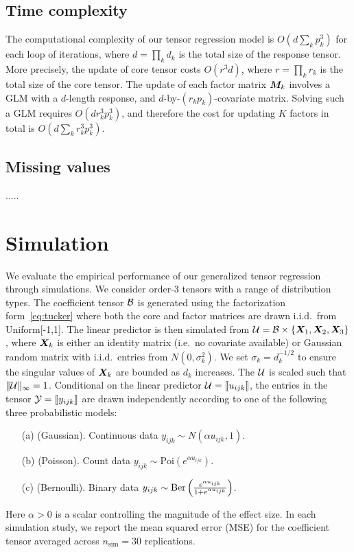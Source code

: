 \documentclass[12pt]{article}
\theoremstyle{plain}
\theoremstyle{definition}
\begin{document}
\subsection{Time complexity}
The computational complexity of our tensor regression model is $O\left(d \sum_k p^3_k\right)$ for each loop of iterations, where $d=\prod_k d_k$ is the total size of the response tensor. More precisely, the update of core tensor costs $O(r^3d)$, where $r=\prod_k r_k$ is the total size of the core tensor. The update of each factor matrix $\bm M_k$ involves a GLM with a $d$-length response, and $d$-by-$(r_kp_k)$-covariate matrix. Solving such a GLM requires $O(dr^3_kp^3_k)$, and therefore the cost for updating $K$ factors in total is $O( d\sum_k r^3_k p_k^3)$.

\subsection{Missing values}
.....

\section{Simulation}\label{sec:simulation}
We evaluate the empirical performance of our generalized tensor regression through simulations. We consider order-3 tensors with a range of distribution types. The coefficient tensor $\mathcal{B}$ is generated using the factorization form~\eqref{eq:tucker} where both the core and factor matrices are drawn i.i.d.\ from Uniform[-1,1]. The linear predictor is then simulated from $\mathcal{U}=\mathcal{B}\times\{\bm X_1,\bm X_2,\bm X_3\}$, where $\bm X_k$ is either an identity matrix (i.e.\ no covariate available) or Gaussian random matrix with i.i.d.\ entries from $N(0,\sigma_k^2)$. We set $\sigma_k=d_k^{-1/2}$ to ensure the singular values of $\bm X_k$ are bounded as $d_k$ increases. The $\mathcal{U}$ is scaled such that $\lVert\mathcal{U}\rVert_\infty=1$. Conditional on the linear predictor $\mathcal{U}=\llbracket u_{ijk} \rrbracket$, the entries in the tensor $\mathcal{Y}=\llbracket y_{ijk} \rrbracket$ are drawn independently according to one of the following three probabilistic models:

\begin{enumerate}
\item[(a)] (Gaussian). Continuous data $y_{ijk}\sim N\left(\alpha u_{ijk}, 1\right)$.
\item[(b)] (Poisson). Count data $y_{ijk}\sim\text{Poi}\left( e^{\alpha u_{ijk}}\right)$.
\item[(c)] (Bernoulli). Binary data $y_{ijk}\sim \text{Ber}\left( {e^{\alpha u_{ijk}} \over 1+e^{\alpha u_{ijk}}}\right)$.
\end{enumerate}
Here $\alpha>0$ is a scalar controlling the magnitude of the effect size. In each simulation study, we report the mean squared error (MSE) for the coefficient tensor averaged across $n_{\text{sim}}=30$ replications. 
\end{document}
